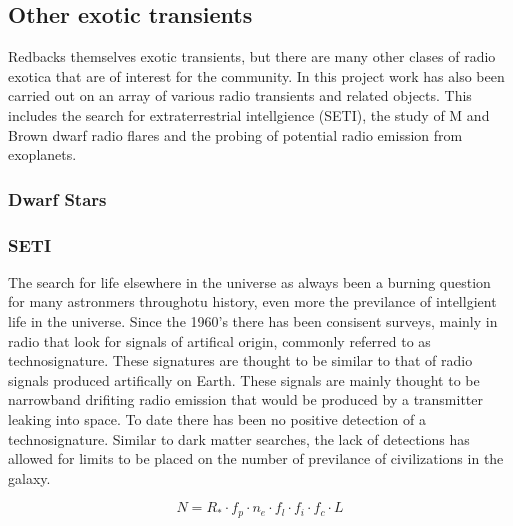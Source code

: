 \subsection{Other exotic transients}

Redbacks themselves exotic transients, but there are many other clases of radio exotica that are of interest for the community. In this project work has also been carried out on an array of various radio transients and related objects. This includes the search for extraterrestrial intellgience (SETI), the study of M and Brown dwarf radio flares and the probing of potential radio emission from exoplanets. 

\subsubsection{Dwarf Stars}

\subsubsection{SETI}

The search for life elsewhere in the universe as always been a burning question for many astronmers throughotu history, even more the previlance of intellgient life in the universe. Since the 1960's there has been consisent surveys, mainly in radio that look for signals of artifical origin, commonly referred to as technosignature. These signatures are thought to be similar to that of radio signals produced artifically on Earth. These signals are mainly thought to be narrowband drifiting radio emission that would be produced by a transmitter leaking into space. To date there has been no positive detection of a technosignature. Similar to dark matter searches, the lack of detections has allowed for limits to be placed on the number of previlance of civilizations in the galaxy.

\begin{equation}
    N = R_* \cdot f_p \cdot n_e \cdot f_l \cdot f_i \cdot f_c \cdot L
\end{equation}



